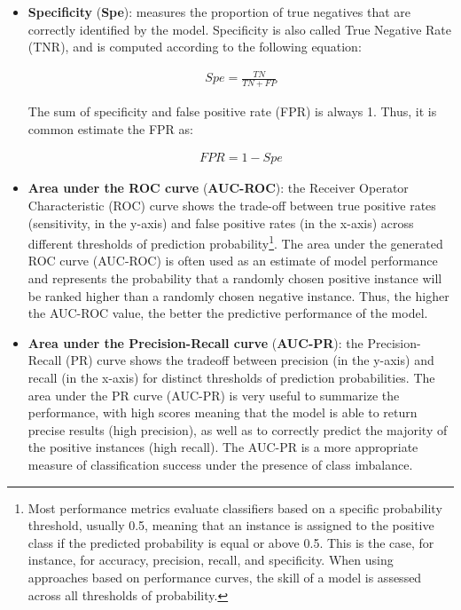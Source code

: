 \begin{itemize}
    \item \textbf{Specificity} (\textbf{Spe}): measures the proportion of true negatives that are correctly identified by the model. Specificity is also called True Negative Rate (TNR), and is computed according to the following equation:
    \begin{ceqn}
    \begin{align}
        Spe =\frac{TN}{TN + FP}
    \end{align}
    \label{eq:especificidade}
    \end{ceqn}
    The sum of specificity and false positive rate (FPR) is always 1. Thus, it is common estimate the FPR as:
        \begin{ceqn}
    \begin{align}
        FPR = 1 - Spe
    \end{align}
    \label{eq:fpr}
    \end{ceqn}
\item \textbf{Area under the ROC curve} (\textbf{AUC-ROC}): the Receiver Operator Characteristic (ROC) curve shows the trade-off between true positive rates (\ie sensitivity, in the y-axis) and false positive rates (in the x-axis) across different thresholds of prediction probability\footnote{Most performance metrics evaluate classifiers based on a specific probability threshold, usually 0.5, meaning that an instance is assigned to the positive class if the predicted probability is equal or above 0.5. This is the case, for instance, for accuracy, precision, recall, and specificity. When using approaches based on performance curves, the skill of a model is assessed across all thresholds of probability.}. The area under the generated ROC curve (AUC-ROC) is often used as an estimate of model performance and represents the probability that a randomly chosen positive instance will be ranked higher than a randomly chosen negative instance. Thus, the higher the AUC-ROC value, the better the predictive performance of the model. 
\item \textbf{Area under the Precision-Recall curve} (\textbf{AUC-PR}): the Precision-Recall (PR) curve shows the tradeoff between precision (\ie in the y-axis) and recall (in the x-axis) for distinct thresholds of prediction probabilities. The area under the PR curve (AUC-PR) is very useful to summarize the performance, with high scores meaning that the model is able to return precise results (high precision), as well as to correctly predict the majority of the positive instances (high recall).  
The AUC-PR is a more appropriate measure of classification success under the presence of class imbalance.

\end{itemize}
